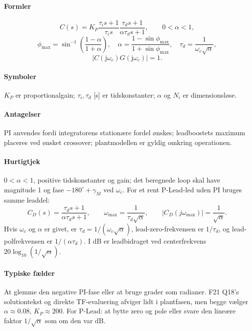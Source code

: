 \paragraph{Formler}
\begin{equation}
\label{eq:pi-lead-controller}
C(s)=K_P\frac{\tau_i s+1}{\tau_i s}
          \frac{\tau_d s+1}{\alpha\tau_d s+1},\qquad 0<\alpha<1,
\end{equation}
\begin{equation}
\label{eq:pi-lead-parameters}
\phi_{\max}=\sin^{-1}\!\left(\frac{1-\alpha}{1+\alpha}\right),\quad
\alpha=\frac{1-\sin\phi_{\max}}{1+\sin\phi_{\max}},\quad
\tau_d=\frac1{\omega_c\sqrt{\alpha}},
\end{equation}
\begin{equation}
\label{eq:pi-lead-magnitude}
\left|C(\mathrm{j}\omega_c)G(\mathrm{j}\omega_c)\right|=1 .
\end{equation}

\paragraph{Symboler}
\(K_P\) er proportionalgain; \(\tau_i,\tau_d\) [s] er tidskonstanter;
\(\alpha\) og \(N_i\) er dimensionsløse.

\paragraph{Antagelser}
PI anvendes fordi integratorens stationære fordel ønskes; leadboostets maximum
placeres ved ønsket crossover; plantmodellen er gyldig omkring operationen.

\paragraph{Hurtigtjek}
\(0<\alpha<1\), positive tidskonstanter og gain; det beregnede loop skal have
magnitude 1 og fase \(-180^\circ+\gamma_M\) ved \(\omega_c\).
For et rent P-Lead-led uden PI bruges samme leaddel:
\[
C_D(s)=\frac{\tau_d s+1}{\alpha\tau_d s+1},\qquad
\omega_{\max}=\frac{1}{\tau_d\sqrt{\alpha}},\qquad
|C_D(j\omega_{\max})|=\frac1{\sqrt{\alpha}}.
\]
Hvis \(\omega_c\) og \(\alpha\) er givet, er
\(\tau_d=1/(\omega_c\sqrt{\alpha})\), lead-zero-frekvensen er \(1/\tau_d\), og
lead-polfrekvensen er \(1/(\alpha\tau_d)\). I dB er leadbidraget ved centerfrekvens
\(20\log_{10}(1/\sqrt{\alpha})\).

\paragraph{Typiske fælder}
At glemme den negative PI-fase eller at bruge grader som radianer. F21 Q18's
solutiontekst og direkte TF-evaluering afviger lidt i plantfasen, men begge vælger
\(\alpha\approx0.08\), \(K_P\approx200\). For P-Lead: at bytte zero og pole eller
svare den lineære faktor \(1/\sqrt{\alpha}\) som om den var dB.

